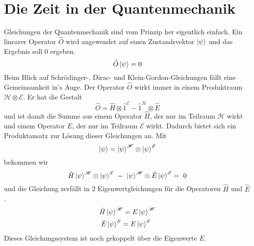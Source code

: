 \documentclass[12pt]{article}
\begin{document}
\section{Die Zeit in der Quantenmechanik}
Gleichungen der Quantenmechanik sind vom Prinzip her eigentlich einfach. Ein linearer Operator $\hat{O}$ wird angewendet auf einen Zustandsvektor $\ket{\psi}$ und das Ergebnis soll $0$ ergeben.
\begin{equation*} 
\hat{O}\ket{\psi} = 0 
\end{equation*}
Beim Blick auf Schrödinger-, Dirac- und Klein-Gordon-Gleichungen fällt eine Gemeinsamkeit in's Auge. Der Operator $\hat{O}$ wirkt immer in einem Produktraum $\mathscr{H} \otimes \mathscr{E}$. Er hat die Gestalt 
\begin{equation*} 
\hat{O} = \hat{H} \otimes \hat{1}^{\mathscr{E}} - \hat{1}^{\mathscr{H}} \otimes \hat{E}
\end{equation*}
und ist damit die Summe aus einem Operator $\hat{H}$, der nur im Teilraum $\mathscr{H}$ wirkt und einem Operator $\hat{E}$, der nur im Teilraum $\mathscr{E}$ wirkt. Dadurch bietet sich ein Produktansatz zur Lösung dieser Gleichungen an. Mit
\begin{equation*} 
\ket{\psi} = \ket{\psi}^{\mathscr{H}} \otimes \ket{\psi}^{\mathscr{E}}
\end{equation*}
bekommen wir
\begin{equation} 
\label{eq:productspace}
\hat{H}\ket{\psi}^{\mathscr{H}} \otimes \ket{\psi}^{\mathscr{E}} 
\ - \ 
\ket{\psi}^{\mathscr{H}} \otimes \hat{E}\ket{\psi}^{\mathscr{E}} =\ 0
\end{equation}
und die Gleichung zerfällt in 2 Eigenwertgleichungen für die Operatoren $\hat{H}$ und $\hat{E}$.
\begin{equation}
\label{eq:system}
\begin{split}
\hat{H}\ket{\psi}^{\mathscr{H}} = E\ket{\psi}^{\mathscr{H}}\\
\hat{E}\ket{\psi}^{\mathscr{E}} = E\ket{\psi}^{\mathscr{E}}\ \ 
\end{split}
\end{equation}
Dieses Gleichungssystem ist noch gekoppelt über die Eigenwerte $E$. 
\end{document}
